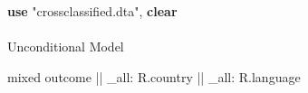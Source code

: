 \documentclass[
  letterpaper,
  DIV=11,
  numbers=noendperiod]{scrreprt}
\makeatletter
\let\oldparagraph\paragraph
\renewcommand{\paragraph}{
    \@ifstar
      \xxxParagraphStar
      \xxxParagraphNoStar
  }
\newcommand{\xxxParagraphStar}[1]{\oldparagraph*{#1}\mbox{}}
\newcommand{\xxxParagraphNoStar}[1]{\oldparagraph{#1}\mbox{}}
\newenvironment{Shaded}{\begin{snugshade}}{\end{snugshade}}
\newcommand{\DataTypeTok}[1]{\textcolor[rgb]{0.68,0.00,0.00}{#1}}
\newcommand{\KeywordTok}[1]{\textcolor[rgb]{0.00,0.23,0.31}{\textbf{#1}}}
\newcommand{\NormalTok}[1]{\textcolor[rgb]{0.00,0.23,0.31}{#1}}
\newcommand{\StringTok}[1]{\textcolor[rgb]{0.13,0.47,0.30}{#1}}
\makeatother
\begin{document}
\begin{Shaded}
\begin{Highlighting}[]

\KeywordTok{use} \StringTok{"crossclassified.dta"}\NormalTok{, }\KeywordTok{clear}
\end{Highlighting}
\end{Shaded}

\paragraph{Unconditional Model}\label{unconditional-model-3}

\begin{Shaded}
\begin{Highlighting}[]

\NormalTok{mixed outcome || }\DataTypeTok{\_all}\NormalTok{: R.country || }\DataTypeTok{\_all}\NormalTok{: R.language}
\end{Highlighting}
\end{Shaded}
\end{document}
